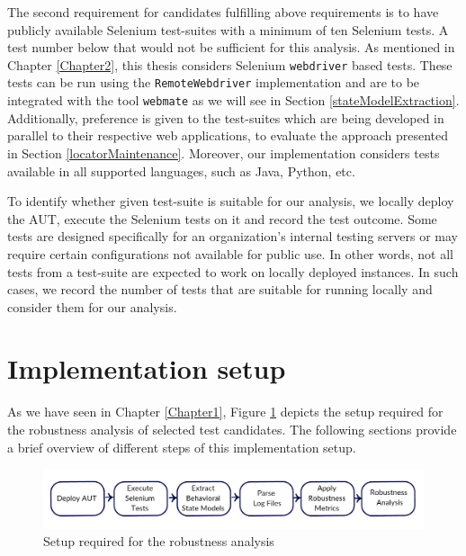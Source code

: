 The second requirement for candidates fulfilling above requirements is to have publicly available Selenium test-suites with a minimum of ten Selenium tests. A test number below that would not be sufficient for this analysis. As mentioned in Chapter \ref{Chapter2}, this thesis considers Selenium \texttt{webdriver} based tests. These tests can be run using the \texttt{RemoteWebdriver} implementation and are to be integrated with the tool \texttt{webmate} as we will see in Section \ref{stateModelExtraction}. Additionally, preference is given to the test-suites which are being developed in parallel to their respective web applications, to evaluate the approach presented in Section \ref{locatorMaintenance}. Moreover, our implementation considers tests available in all supported languages, such as Java, Python, etc. 

To identify whether given test-suite is suitable for our analysis, we locally deploy the AUT, execute the Selenium tests on it and record the test outcome. Some tests are designed specifically for an organization's internal testing servers or may require certain configurations not available for public use. In other words, not all tests from a test-suite are expected to work on locally deployed instances. In such cases, we record the number of tests that are suitable for running locally and consider them for our analysis. 


\section{Implementation setup}
\label{implementationsetup}
As we have seen in Chapter \ref{Chapter1}, Figure \ref{fig:thesisoverview2} depicts the setup required for the robustness analysis of selected test candidates. The following sections provide a brief overview of different steps of this implementation setup.  
\begin{figure}[h]
	\centering	\includegraphics[width=\textwidth]{./Figures/thesisoverviewsmall.jpg}
	\caption{Setup required for the robustness analysis}
	\label{fig:thesisoverview2}
\end{figure} 

